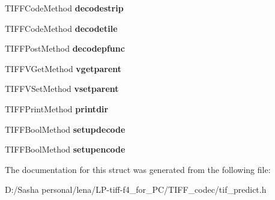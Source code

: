 \begin{DoxyCompactItemize}
\item 
\hypertarget{struct_t_i_f_f_predictor_state_a638407e0d94d1d7ac5318fdd864662d9}{}T\+I\+F\+F\+Code\+Method {\bfseries decodestrip}\label{struct_t_i_f_f_predictor_state_a638407e0d94d1d7ac5318fdd864662d9}

\item 
\hypertarget{struct_t_i_f_f_predictor_state_a763a312d151aa0780b4dacde9731465a}{}T\+I\+F\+F\+Code\+Method {\bfseries decodetile}\label{struct_t_i_f_f_predictor_state_a763a312d151aa0780b4dacde9731465a}

\item 
\hypertarget{struct_t_i_f_f_predictor_state_a4d9b419abda63a6f6c950e67fa2f7288}{}T\+I\+F\+F\+Post\+Method {\bfseries decodepfunc}\label{struct_t_i_f_f_predictor_state_a4d9b419abda63a6f6c950e67fa2f7288}

\item 
\hypertarget{struct_t_i_f_f_predictor_state_a6aa94880716a95ef6ecb6504e377e504}{}T\+I\+F\+F\+V\+Get\+Method {\bfseries vgetparent}\label{struct_t_i_f_f_predictor_state_a6aa94880716a95ef6ecb6504e377e504}

\item 
\hypertarget{struct_t_i_f_f_predictor_state_ad3e8072d4883a6686f64fb7671e9b3c1}{}T\+I\+F\+F\+V\+Set\+Method {\bfseries vsetparent}\label{struct_t_i_f_f_predictor_state_ad3e8072d4883a6686f64fb7671e9b3c1}

\item 
\hypertarget{struct_t_i_f_f_predictor_state_ac3f672c5186abaf1350e3e0b70245ad7}{}T\+I\+F\+F\+Print\+Method {\bfseries printdir}\label{struct_t_i_f_f_predictor_state_ac3f672c5186abaf1350e3e0b70245ad7}

\item 
\hypertarget{struct_t_i_f_f_predictor_state_a6788aff2012e129e74486da22ecedd58}{}T\+I\+F\+F\+Bool\+Method {\bfseries setupdecode}\label{struct_t_i_f_f_predictor_state_a6788aff2012e129e74486da22ecedd58}

\item 
\hypertarget{struct_t_i_f_f_predictor_state_a65c56dd5d968264eea3797d9d1c51965}{}T\+I\+F\+F\+Bool\+Method {\bfseries setupencode}\label{struct_t_i_f_f_predictor_state_a65c56dd5d968264eea3797d9d1c51965}

\end{DoxyCompactItemize}


The documentation for this struct was generated from the following file\+:\begin{DoxyCompactItemize}
\item 
D\+:/\+Sasha personal/lena/\+L\+P-\/tiff-\/f4\+\_\+for\+\_\+\+P\+C/\+T\+I\+F\+F\+\_\+codec/tif\+\_\+predict.\+h\end{DoxyCompactItemize}
